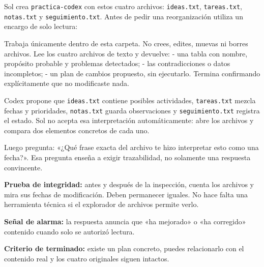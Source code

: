 \documentclass[10pt,a4paper,openany]{book}
\newenvironment{Shaded}{}{}
\newcommand{\NormalTok}[1]{#1}
\renewenvironment{Shaded}
  {\begin{tcolorbox}[
    enhanced,
    breakable,
    colback=CodeBg,
    colframe=Border,
    boxrule=0.5pt,
    arc=2mm,
    left=3mm,
    right=3mm,
    top=2.2mm,
    bottom=2.2mm,
    before skip=0.8em,
    after skip=0.9em
  ]}
  {\end{tcolorbox}}
\begin{document}
Sol crea \texttt{practica-codex} con estos cuatro archivos:
\texttt{ideas.txt}, \texttt{tareas.txt}, \texttt{notas.txt} y
\texttt{seguimiento.txt}. Antes de pedir una reorganización utiliza un
encargo de solo lectura:

\begin{Shaded}
\begin{Highlighting}[]
\NormalTok{Trabaja únicamente dentro de esta carpeta.}
\NormalTok{No crees, edites, muevas ni borres archivos.}
\NormalTok{Lee los cuatro archivos de texto y devuelve:}
\NormalTok{{-} una tabla con nombre, propósito probable y problemas detectados;}
\NormalTok{{-} las contradicciones o datos incompletos;}
\NormalTok{{-} un plan de cambios propuesto, sin ejecutarlo.}
\NormalTok{Termina confirmando explícitamente que no modificaste nada.}
\end{Highlighting}
\end{Shaded}

Codex propone que \texttt{ideas.txt} contiene posibles actividades,
\texttt{tareas.txt} mezcla fechas y prioridades, \texttt{notas.txt}
guarda observaciones y \texttt{seguimiento.txt} registra el estado. Sol
no acepta esa interpretación automáticamente: abre los archivos y
compara dos elementos concretos de cada uno.

Luego pregunta: «¿Qué frase exacta del archivo te hizo interpretar esto
como una fecha?». Esa pregunta enseña a exigir trazabilidad, no
solamente una respuesta convincente.

\begin{tipbox}

\textbf{Prueba de integridad:} antes y después de la inspección, cuenta
los archivos y mira sus fechas de modificación. Deben permanecer
iguales. No hace falta una herramienta técnica si el explorador de
archivos permite verlo.

\end{tipbox}

\begin{warningbox}

\textbf{Señal de alarma:} la respuesta anuncia que «ha mejorado» o «ha
corregido» contenido cuando solo se autorizó lectura.

\end{warningbox}

\begin{successbox}

\textbf{Criterio de terminado:} existe un plan concreto, puedes
relacionarlo con el contenido real y los cuatro originales siguen
intactos.

\end{successbox}
\end{document}

